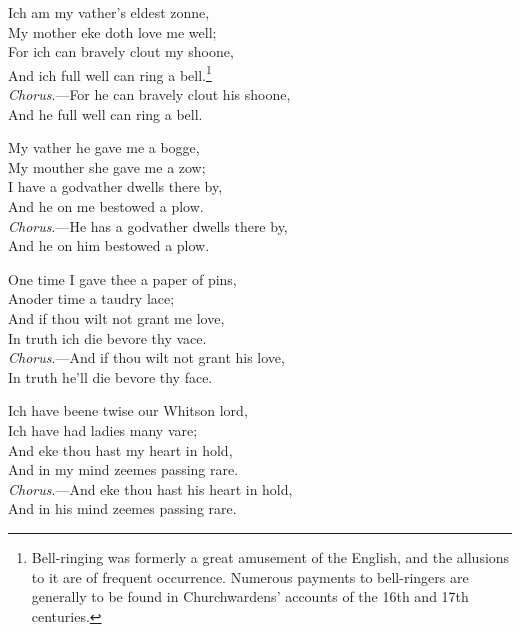 \smallskip



\begin{dcverse}\begin{patverse}
\vin Ich am my vather's eldest zonne,\\
My mother eke doth love me well;\\
For ich can bravely clout my shoone,\\
And ich full well can ring a bell.\footnote{
Bell-ringing was formerly a great amusement of the
English, and the allusions to it are of frequent occurrence.
Numerous payments to bell-ringers are generally to be
found in Churchwardens’ accounts of the 16th and 17th
centuries.}\\
\textit{Chorus}.—For he can bravely clout his shoone,\\
And he full well can ring a bell.
\end{patverse}

\begin{patverse}
\vin My vather he gave me a bogge,\\
My mouther she gave me a zow;\\
I have a godvather dwells there by,\\
And he on me bestowed a plow.\\
\textit{Chorus}.—He has a godvather dwells there by,\\
And he on him bestowed a plow.
\end{patverse}

\begin{patverse}
\vin One time I gave thee a paper of pins,\\
Anoder time a taudry lace;\\
And if thou wilt not grant me love,\\
In truth ich die bevore thy vace.\\
\textit{Chorus}.—And if thou wilt not grant his love,\\
In truth he’ll die bevore thy face.
\end{patverse}

\begin{patverse}
\vin Ich have beene twise our Whitson lord,\\
Ich have had ladies many vare;\\
And eke thou hast my heart in hold,\\
And in my mind zeemes passing rare.\\
\textit{Chorus}.—And eke thou hast his heart in hold,\\
And in his mind zeemes passing rare.
\end{patverse}


\end{dcverse}
